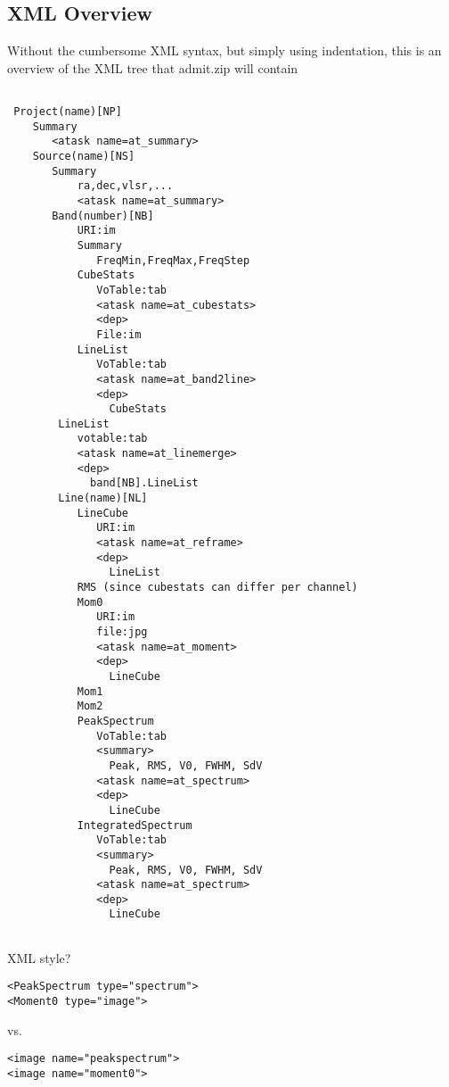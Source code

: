 \documentclass{report}
\begin{document}
\subsection{XML Overview}
Without the cumbersome XML syntax, but simply using indentation, this is an overview
of the XML tree that admit.zip will contain

\newpage

\footnotesize
\begin{verbatim}

 Project(name)[NP]
    Summary
       <atask name=at_summary>
    Source(name)[NS]
       Summary
           ra,dec,vlsr,...
           <atask name=at_summary>
       Band(number)[NB]
           URI:im
           Summary
              FreqMin,FreqMax,FreqStep
           CubeStats
              VoTable:tab
              <atask name=at_cubestats>
              <dep>
              File:im
           LineList
              VoTable:tab
              <atask name=at_band2line>
              <dep>
                CubeStats
        LineList
           votable:tab
           <atask name=at_linemerge>
           <dep>
             band[NB].LineList
        Line(name)[NL]
           LineCube
              URI:im
              <atask name=at_reframe>
              <dep>
                LineList
           RMS (since cubestats can differ per channel)
           Mom0
              URI:im
              file:jpg
              <atask name=at_moment>
              <dep>
                LineCube
           Mom1
           Mom2
           PeakSpectrum
              VoTable:tab
              <summary>
                Peak, RMS, V0, FWHM, SdV
              <atask name=at_spectrum>
              <dep>
                LineCube
           IntegratedSpectrum
              VoTable:tab
              <summary>
                Peak, RMS, V0, FWHM, SdV
              <atask name=at_spectrum>
              <dep>
                LineCube


\end{verbatim}
\normalsize

\newpage



XML style?

\footnotesize
\begin{verbatim}
<PeakSpectrum type="spectrum">
<Moment0 type="image">
\end{verbatim}
\normalsize
vs.

\footnotesize
\begin{verbatim}
<image name="peakspectrum">
<image name="moment0">
\end{verbatim}
\normalsize
\end{document}
